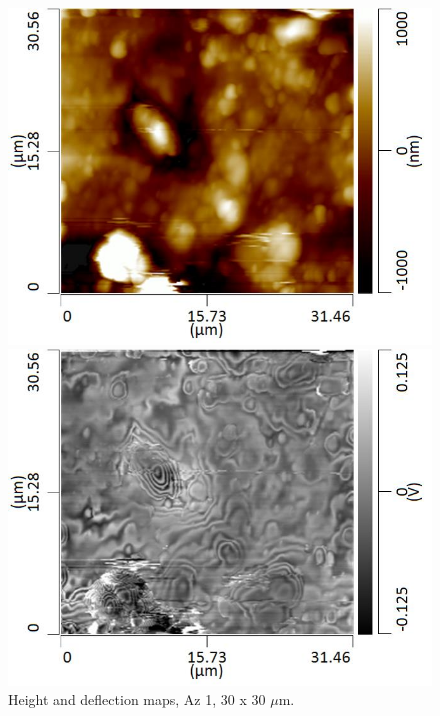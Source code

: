 \begin{figure}[H]
\centering
\begin{minipage}{.45\textwidth}
  \centering
  \includegraphics[width=\linewidth]{Az1_tapping_mode_240521_height_2}
\end{minipage}
\begin{minipage}{.45\textwidth}
  \centering
  \includegraphics[width=\linewidth]{Az1_tapping_mode_240521_def_2}
\end{minipage}
\caption[Height and deflection maps, Az 1]{Height and deflection maps, Az 1, 30 x 30 $\mu$m.}
\label{fig:afm_az1_height_def_2}
\end{figure}

